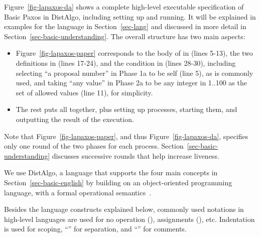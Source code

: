 \documentclass[11pt]{article}
\newcommand\p[1]{\m{#1}}
\newcommand\m[1]{\mbox{$#1$}} %
\begin{document}
Figure~\ref{fig-lapaxos-da} shows a complete high-level executable
specification of Basic Paxos in DistAlgo, including setting up and running.
It will be explained in examples for the language in Section~\ref{sec-lang}
and discussed in more detail in Section~\ref{sec-basic-understanding}.  The
overall structure has two main aspects:
\begin{itemize}

\item Figure~\ref{fig-lapaxos-paper} corresponds to the body of  in
   (lines 5-13), the two  definitions in
   (lines 17-24), and the  condition in
   (lines 28-30), %
  including selecting ``a proposal number'' in Phase 1a to be self (line
  5), as is commonly used, %
  and taking ``any value'' in Phase 2a to be any integer in %
  1..100 as the set of allowed values (line 11), for simplicity.

\item The rest %
  puts all together, plus setting up processes, starting them, and
  outputting the result of the execution.

\end{itemize}
Note that Figure~\ref{fig-lapaxos-paper}, and thus
Figure~\ref{fig-lapaxos-da}, specifies only one round of the two phases for
each process.  Section~\ref{sec-basic-understanding} discusses successive
rounds that help increase liveness.


\label{sec-lang}

We use DistAlgo, a language that supports the four main concepts in
Section~\ref{sec-basic-english} by building on an object-oriented
programming language, with a formal operational
semantics~\cite{Liu+17DistPL-TOPLAS}.

Besides the language constructs explained below, commonly used notations in
high-level languages are used for no operation (), assignments
(\co{\p{v}\,:=\,\p{e}}), etc.
Indentation is used for scoping, ``\co{:}'' for separation, and ``\co{\#}''
for comments.
\end{document}
